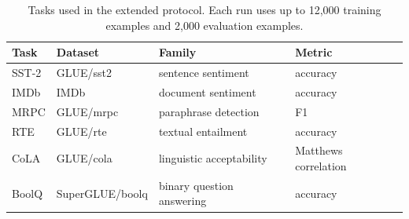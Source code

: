 \begin{table}[t]
\centering
\caption{Tasks used in the extended protocol. Each run uses up to 12,000 training examples and 2,000 evaluation examples.}
\label{tab:task-protocol}
\begin{tabular}{llll}
\hline
Task & Dataset & Family & Metric \\
\hline
SST-2 & GLUE/sst2 & sentence sentiment & accuracy \\
IMDb & IMDb & document sentiment & accuracy \\
MRPC & GLUE/mrpc & paraphrase detection & F1 \\
RTE & GLUE/rte & textual entailment & accuracy \\
CoLA & GLUE/cola & linguistic acceptability & Matthews correlation \\
BoolQ & SuperGLUE/boolq & binary question answering & accuracy \\
\hline
\end{tabular}
\end{table}
